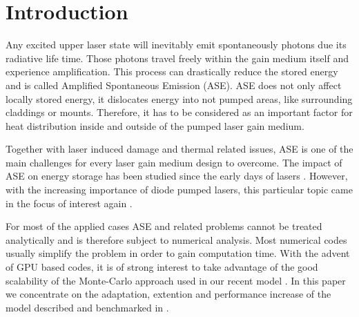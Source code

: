 \section{Introduction}

Any excited upper laser state will inevitably emit spontaneously photons due
its radiative life time. Those photons travel freely within the gain medium
itself and experience amplification. This process can drastically reduce the
stored energy and is called Amplified Spontaneous Emission (ASE). ASE does not
only affect locally stored energy, it dislocates energy into not pumped areas,
like surrounding claddings or mounts. Therefore, it has to be considered as an
important factor for heat distribution inside and outside of the pumped laser
gain medium.

Together with laser induced damage and thermal related issues, ASE is one of the
main challenges for every laser gain medium design to overcome. The impact of ASE on
energy storage has been studied since the early days of lasers \cite{Intro1,Intro2,Intro3}.
However, with the increasing importance of diode pumped lasers, this particular
topic came in the focus of interest again \cite{Intro4}.

For most of the applied cases ASE and related problems cannot be treated
analytically and is therefore subject to numerical analysis. Most numerical
codes usually simplify the problem in order to gain computation time. With the
advent of GPU based codes, it is of strong interest to take advantage of the
good scalability of the Monte-Carlo approach used in our recent model \cite{Intro4}.
In this paper we concentrate on the adaptation, extention and performance
increase of the model described and benchmarked in \cite{Intro4}.
